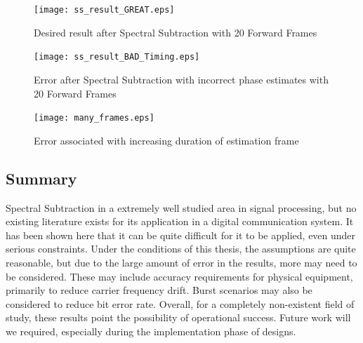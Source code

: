 \begin{figure}\label{ss_result_great}
\centering
\texttt{[image: ss\_result\_GREAT.eps]}
\caption{Desired result after Spectral Subtraction with 20 Forward Frames}
\end{figure}

\begin{figure}\label{ss_result_bad}
\centering
\texttt{[image: ss\_result\_BAD\_Timing.eps]}
\caption{Error after Spectral Subtraction with incorrect phase estimates with 20 Forward Frames}
\end{figure}

\begin{figure}\label{many_frames}
\centering
\texttt{[image: many\_frames.eps]}
\caption{Error associated with increasing duration of estimation frame}
\end{figure}




\subsection{Summary}

Spectral Subtraction in a extremely well studied area in signal processing, but no existing literature exists for its application in a digital communication system.  It has been shown here that it can be quite difficult for it to be applied, even under serious constraints.  Under the conditions of this thesis, the assumptions are quite reasonable, but due to the large amount of error in the results, more may need to be considered.  These may include accuracy requirements for physical equipment, primarily to reduce carrier frequency drift.  Burst scenarios may also be considered to reduce bit error rate.  Overall, for a completely non-existent field of study, these results point the possibility of operational success.  Future work will we required, especially during the implementation phase of designs.\\

